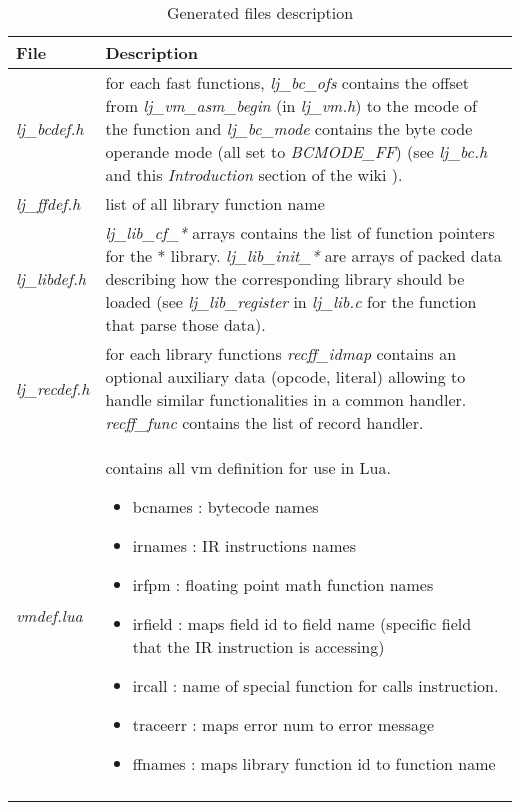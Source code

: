 \begin{center}
\begin{longtable}[H]{|p{4cm}|p{9cm}|}
\hline
\textbf{File}          & \textbf{Description}                     \\\hline
\emph{lj\_bcdef.h}                  &
  for each fast functions, \emph{lj\_bc\_ofs} contains the offset from
  \emph{lj\_vm\_asm\_begin} (in \emph{lj\_vm.h}) to the mcode of the function
  and \emph{lj\_bc\_mode} contains the byte code operande mode (all set to
  \emph{BCMODE\_FF}) (see \emph{lj\_bc.h} and this \emph{Introduction} section
  of the wiki \cite{luajit-bc}).                                                            \\\hline
\emph{lj\_ffdef.h}                  & list of all library function name                     \\\hline
\emph{lj\_libdef.h}                 &
  \emph{lj\_lib\_cf\_*} arrays contains the list of function pointers for the
  * library. \emph{lj\_lib\_init\_*} are arrays of packed data describing how
  the corresponding library should be loaded (see \emph{lj\_lib\_register} in
  \emph{lj\_lib.c} for the function that parse those data).                                 \\\hline
\emph{lj\_recdef.h}                 &
  for each library functions \emph{recff\_idmap} contains an optional auxiliary
  data (opcode, literal) allowing to handle similar functionalities in a
  common handler. \emph{recff\_func} contains the list of record handler.                   \\\hline
\emph{vmdef.lua}                    &
  contains all vm definition for use in Lua.
  \begin{itemize}
  \item bcnames  : bytecode names
  \item irnames  : IR instructions names
  \item irfpm    : floating point math function names
  \item irfield  : maps field id to field name (specific field that the IR instruction is accessing)
  \item ircall   : name of special function for calls instruction.
  \item traceerr : maps error num to error message
  \item ffnames  : maps library function id to function name
  \end{itemize} \\ \hline
  \caption{Generated files description}
  \label{tab:library-generated-files}
\end{longtable}
\end{center}

